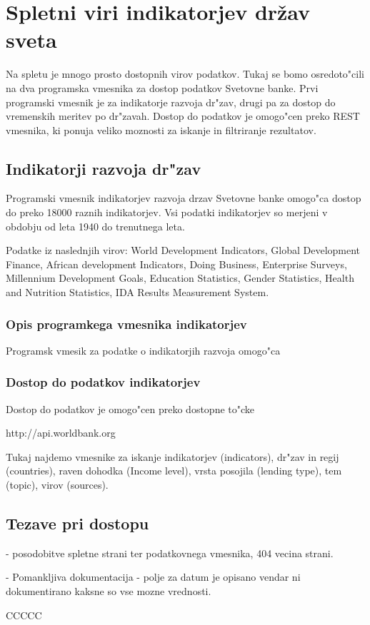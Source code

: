 \chapter{Spletni viri indikatorjev držav sveta}

Na spletu je mnogo prosto dostopnih virov podatkov. Tukaj se bomo osredoto"cili
na dva programska vmesnika za dostop podatkov Svetovne banke. Prvi programski
vmesnik je za indikatorje razvoja dr"zav, drugi pa za dostop do vremenskih
meritev po dr"zavah. Dostop do podatkov je omogo"cen preko REST vmesnika, ki
ponuja veliko moznosti za iskanje in filtriranje rezultatov.


\section{Indikatorji razvoja dr"zav}

Programski vmesnik indikatorjev razvoja drzav Svetovne banke omogo"ca dostop
do preko 18000 raznih indikatorjev. Vsi podatki indikatorjev so merjeni v
obdobju od leta 1940 do trenutnega leta. 

Podatke iz naslednjih virov:
World Development Indicators, 
Global Development Finance, 
African development Indicators, 
Doing Business,
Enterprise Surveys, 
Millennium Development Goals, 
Education Statistics, 
Gender Statistics,
Health and Nutrition Statistics, 
IDA Results Measurement System.


\subsection{Opis programkega vmesnika indikatorjev}


Programsk vmesik za podatke o indikatorjih razvoja omogo"ca 


\subsection{Dostop do podatkov indikatorjev}

Dostop do podatkov je omogo"cen preko dostopne to"cke

http://api.worldbank.org

Tukaj najdemo vmesnike za iskanje indikatorjev (indicators), dr"zav in regij
(countries), raven dohodka (Income level), vrsta posojila (lending type), tem
(topic), virov (sources).





\section{Tezave pri dostopu}

- posodobitve spletne strani ter podatkovnega vmesnika, 404 vecina strani.

- Pomankljiva dokumentacija
    - polje za datum je opisano vendar ni dokumentirano kaksne so vse mozne
      vrednosti. 

CCCCC
